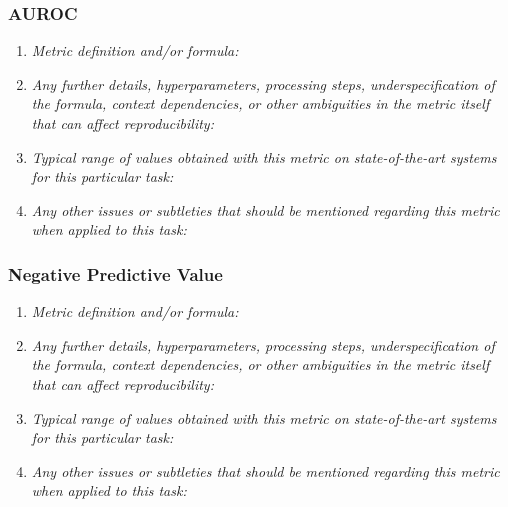 \documentclass[a4paper,11pt]{article}
\begin{document}
        \subsubsection{AUROC}
            \begin{enumerate}[label=\alph*.]
                \item \textit{Metric definition and/or formula:}
                \bigskip
                \item \textit{Any further details, hyperparameters, processing steps, underspecification of the formula, context dependencies, or other ambiguities in the metric itself that can affect reproducibility:}
                \bigskip
                \item \textit{Typical range of values obtained with this metric on state-of-the-art systems for this particular task:}
                \bigskip
                \item \textit{Any other issues or subtleties that should be mentioned regarding this metric when applied to this task:}
                \bigskip
            \end{enumerate}
        \subsubsection{Negative Predictive Value}
            \begin{enumerate}[label=\alph*.]
                \item \textit{Metric definition and/or formula:}
                \bigskip
                \item \textit{Any further details, hyperparameters, processing steps, underspecification of the formula, context dependencies, or other ambiguities in the metric itself that can affect reproducibility:}
                \bigskip
                \item \textit{Typical range of values obtained with this metric on state-of-the-art systems for this particular task:}
                \bigskip
                \item \textit{Any other issues or subtleties that should be mentioned regarding this metric when applied to this task:}
                \bigskip
            \end{enumerate}
\end{document}
